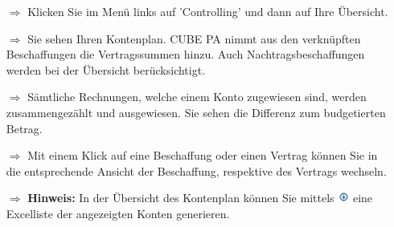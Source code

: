 \documentclass{article}
\begin{document}
\begin{multicols}{2}

\begin{tcolorbox}[colback=blue!5,colframe=blue!40!black,title=Rechnungskontrolle]
\begin{itemize}
  \item[$\Longrightarrow$] Klicken Sie im Menü links auf 'Controlling' und dann auf Ihre Übersicht.
	\item[$\Longrightarrow$] Sie sehen Ihren Kontenplan. CUBE PA nimmt aus den verknüpften Beschaffungen die Vertragssummen hinzu. Auch Nachtragsbeschaffungen werden bei der Übersicht berücksichtigt.
  \item[$\Longrightarrow$] Sämtliche Rechnungen, welche einem Konto zugewiesen sind, werden zusammengezählt und ausgewiesen. Sie sehen die Differenz zum budgetierten Betrag.
  \item[$\Longrightarrow$] Mit einem Klick auf eine Beschaffung oder einen Vertrag können Sie in die entsprechende Ansicht der Beschaffung, respektive des Vertrags wechseln.
  \item[$\Longrightarrow$] \textbf{Hinweis:} In der Übersicht des Kontenplan können Sie mittels \includegraphics[height=10pt]{Icons/ListeGenerieren.jpg} eine Excelliste der angezeigten Konten generieren.
\end{itemize}
\end{tcolorbox}



\end{multicols}
\end{document}
